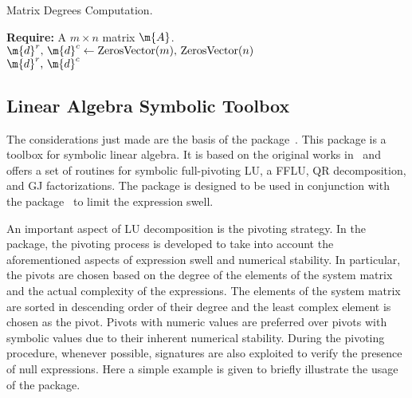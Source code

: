 \begin{breakablealgorithm}
  \caption{Matrix Degrees Computation.}
  \label{chap2:alg:compute_degrees}
  \begin{algorithmic}[1]
    \State \textbf{Require:} A $m \times n$ matrix $\m{A}$.
     
    \State $\m{d}^r, \, \m{d}^c \gets \mathrm{ZerosVector}(m), \, \mathrm{ZerosVector}(n)$ 
     
       
         
      \EndFor
    \EndFor
     
       
         
      \EndFor
    \EndFor \\
    \Return $\m{d}^r, \, \m{d}^c$ 
    \EndProcedure
  \end{algorithmic}
\end{breakablealgorithm}

\subsection{Linear Algebra Symbolic Toolbox}

The considerations just made are the basis of the \LAST{} package~\cite{last}. This package is a \Maple{} toolbox for symbolic linear algebra. It is based on the original works in~\cite{carette2006linear,zhou2008fraction} and offers a set of routines for symbolic full-pivoting \ac{LU}, a \ac{FFLU}, QR decomposition, and \ac{GJ} factorizations. The package \LAST{} is designed to be used in conjunction with the \LEM{} package~\cite{lem} to limit the expression swell.

An important aspect of \ac{LU} decomposition is the pivoting strategy. In the \LAST{} package, the pivoting process is developed to take into account the aforementioned aspects of expression swell and numerical stability. In particular, the pivots are chosen based on the degree of the elements of the system matrix and the actual complexity of the expressions. The elements of the system matrix are sorted in descending order of their degree and the least complex element is chosen as the pivot. Pivots with numeric values are preferred over pivots with symbolic values due to their inherent numerical stability. During the pivoting procedure, whenever possible, signatures are also exploited to verify the presence of null expressions. Here a simple example is given to briefly illustrate the usage of the \LAST{} package.

